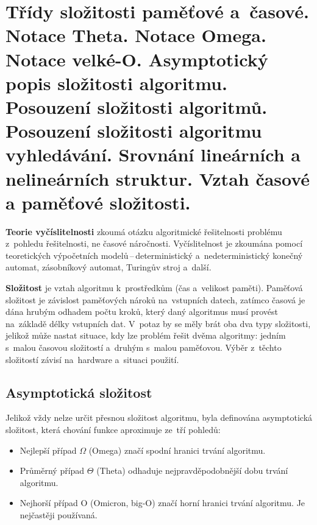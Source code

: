 
\clearpage
\section{Třídy složitosti paměťové a~časové. Notace Theta. Notace Omega. Notace velké-O. Asymptotický popis složitosti algoritmu. Posouzení složitosti algoritmů. Posouzení složitosti algoritmu vyhledávání. Srovnání lineárních a nelineárních struktur. Vztah časové a paměťové složitosti.}

\textbf{Teorie vyčíslitelnosti} zkoumá otázku algoritmické řešitelnosti problému z~pohledu řešitelnosti, ne časové náročnosti. Vyčíslitelnost je zkoumána pomocí teoretických výpočetních modelů\,--\,deterministický a~nedeterministický konečný automat, zásobníkový automat, Turingův stroj a~další.

\textbf{Složitost} je vztah algoritmu k~prostředkům (čas a~velikost paměti). Paměťová složitost je závislost paměťových nároků na~vstupních datech, zatímco časová je dána hrubým odhadem počtu kroků, který daný algoritmus musí provést na~základě délky vstupních dat. V~potaz by se měly brát oba dva typy složitosti, jelikož může nastat situace, kdy lze problém řešit dvěma algoritmy: jedním s~malou časovou složitostí a~druhým s~malou paměťovou. Výběr z~těchto složitostí závisí na~hardware a~situaci použití.

\subsection{Asymptotická složitost}

Jelikož vždy nelze určit přesnou složitost algoritmu, byla definována asymptotická složitost, která chování funkce aproximuje ze~tří pohledů:

\begin{itemize}
	\item Nejlepší případ \( \Omega \) (Omega) značí spodní hranici trvání algoritmu.
	\item Průměrný případ \( \Theta \) (Theta) odhaduje nejpravděpodobnější dobu trvání algoritmu.
	\item Nejhorší případ O (Omicron, big-O) značí horní hranici trvání algoritmu. Je nejčastěji používaná.
\end{itemize}

